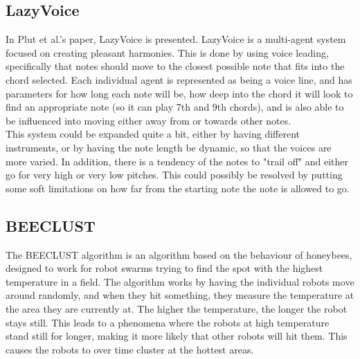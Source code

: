 \documentclass[a4paper,english]{report}
\begin{document}
	\subsection{LazyVoice}
	In Plut et al.'s paper, LazyVoice is presented. LazyVoice is a multi-agent system focused on creating pleasant harmonies. This is done by using voice leading, specifically that notes should move to the closest possible note that fits into the chord selected. Each individual agent is represented as being a voice line, and has parameters for how long each note will be, how deep into the chord it will look to find an appropriate note (so it can play 7th and 9th chords), and is also able to be influenced into moving either away from or towards other notes.\\
	This system could be expanded quite a bit, either by having different instruments, or by having the note length be dynamic, so that the voices are more varied. In addition, there is a tendency of the notes to "trail off" and either go for very high or very low pitches. This could possibly be resolved by putting some soft limitations on how far from the starting note the note is allowed to go.
	\fi
	
	\subsection{BEECLUST}
	The BEECLUST algorithm is an algorithm based on the behaviour of honeybees, designed to work for robot swarms trying to find the spot with the highest temperature in a field. The algorithm works by having the individual robots move around randomly, and when they hit something, they measure the temperature at the area they are currently at. The higher the temperature, the longer the robot stays still. This leads to a phenomena where the robots at high temperature stand still for longer, making it more likely that other robots will hit them. This causes the robots to over time cluster at the hottest areas.
	
\end{document}
